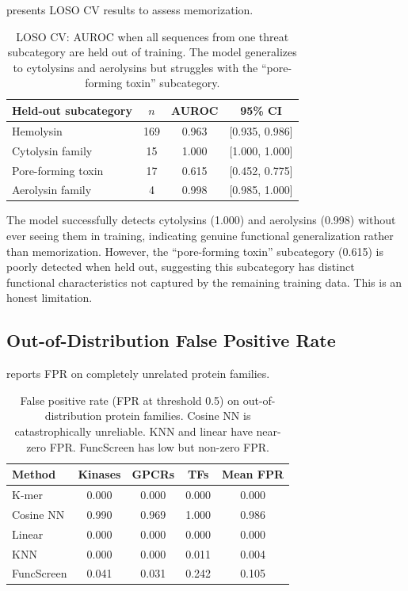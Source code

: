 \documentclass[11pt,a4paper]{article}
\begin{document}
 presents LOSO CV results to assess memorization.

\begin{table}[H]
\centering
\caption{LOSO CV: AUROC when all sequences from one threat subcategory are held out of training. The model generalizes to cytolysins and aerolysins but struggles with the ``pore-forming toxin'' subcategory.}
\label{tab:loso}
\small
\begin{tabular}{@{}lccc@{}}
\toprule
\textbf{Held-out subcategory} & \textbf{$n$} & \textbf{AUROC} & \textbf{95\% CI} \\
\midrule
Hemolysin & 169 & 0.963 & [0.935, 0.986] \\
Cytolysin family & 15 & 1.000 & [1.000, 1.000] \\
Pore-forming toxin & 17 & 0.615 & [0.452, 0.775] \\
Aerolysin family & 4 & 0.998 & [0.985, 1.000] \\
\bottomrule
\end{tabular}
\end{table}

The model successfully detects cytolysins (1.000) and aerolysins (0.998) without ever seeing them in training, indicating genuine functional generalization rather than memorization. However, the ``pore-forming toxin'' subcategory (0.615) is poorly detected when held out, suggesting this subcategory has distinct functional characteristics not captured by the remaining training data. This is an honest limitation.

\subsection{Out-of-Distribution False Positive Rate}

 reports FPR on completely unrelated protein families.

\begin{table}[H]
\centering
\caption{False positive rate (FPR at threshold 0.5) on out-of-distribution protein families. Cosine NN is catastrophically unreliable. KNN and linear have near-zero FPR. FuncScreen has low but non-zero FPR.}
\label{tab:ood}
\small
\begin{tabular}{@{}lcccc@{}}
\toprule
\textbf{Method} & \textbf{Kinases} & \textbf{GPCRs} & \textbf{TFs} & \textbf{Mean FPR} \\
\midrule
K-mer & 0.000 & 0.000 & 0.000 & 0.000 \\
Cosine NN & 0.990 & 0.969 & 1.000 & 0.986 \\
Linear & 0.000 & 0.000 & 0.000 & 0.000 \\
KNN & 0.000 & 0.000 & 0.011 & 0.004 \\
FuncScreen & 0.041 & 0.031 & 0.242 & 0.105 \\
\bottomrule
\end{tabular}
\end{table}
\end{document}
